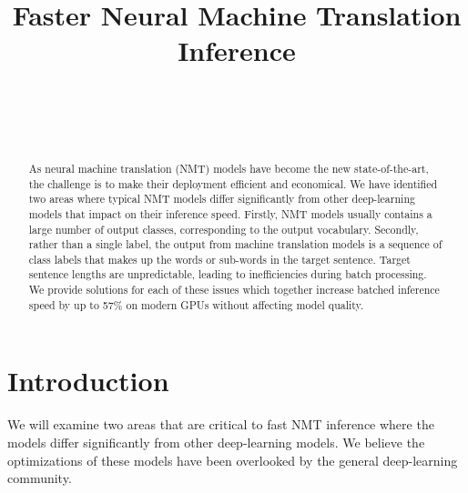 \documentclass[11pt,a4paper]{article}
\begin{document}
\title{\bf Faster Neural Machine Translation Inference}  

\author{ \hfill  {}\\ 
        \addr{}
\AND
        \hfill {}\\
\AND
        \hfill {}\\
}

\maketitle
\pagestyle{empty}

\begin{abstract}

As neural machine translation (NMT) models have become the new state-of-the-art, the challenge is to make their deployment efficient and economical. We have identified two areas where typical NMT models differ significantly from other deep-learning models that impact on their inference speed. Firstly, NMT models usually contains a large number of output classes, corresponding to the output vocabulary. Secondly, rather than a single label, the output from machine translation models is a sequence of class labels that makes up the words or sub-words in the target sentence. Target sentence lengths are unpredictable, leading to inefficiencies during batch processing. We provide solutions for each of these issues which together increase batched inference speed by up to 57\% on modern GPUs without affecting model quality.

\end{abstract}

\section{Introduction}
\label{sec:Introduction}

We will examine two areas that are critical to fast NMT inference where the models differ significantly from other deep-learning models. We believe the optimizations of these models have been overlooked by the general deep-learning community.
\end{document}
